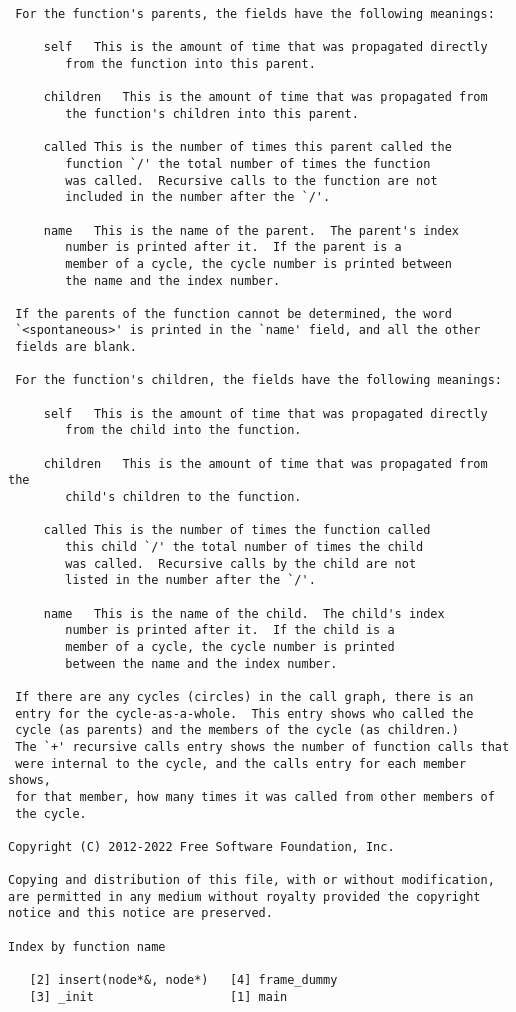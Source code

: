 \documentclass[pdf, unicode, 12pt, a4paper,oneside,fleqn]{article}
\begin{document}
\begin{lstlisting}
 For the function's parents, the fields have the following meanings:

     self	This is the amount of time that was propagated directly
		from the function into this parent.

     children	This is the amount of time that was propagated from
		the function's children into this parent.

     called	This is the number of times this parent called the
		function `/' the total number of times the function
		was called.  Recursive calls to the function are not
		included in the number after the `/'.

     name	This is the name of the parent.  The parent's index
		number is printed after it.  If the parent is a
		member of a cycle, the cycle number is printed between
		the name and the index number.

 If the parents of the function cannot be determined, the word
 `<spontaneous>' is printed in the `name' field, and all the other
 fields are blank.

 For the function's children, the fields have the following meanings:

     self	This is the amount of time that was propagated directly
		from the child into the function.

     children	This is the amount of time that was propagated from the
		child's children to the function.

     called	This is the number of times the function called
		this child `/' the total number of times the child
		was called.  Recursive calls by the child are not
		listed in the number after the `/'.

     name	This is the name of the child.  The child's index
		number is printed after it.  If the child is a
		member of a cycle, the cycle number is printed
		between the name and the index number.

 If there are any cycles (circles) in the call graph, there is an
 entry for the cycle-as-a-whole.  This entry shows who called the
 cycle (as parents) and the members of the cycle (as children.)
 The `+' recursive calls entry shows the number of function calls that
 were internal to the cycle, and the calls entry for each member shows,
 for that member, how many times it was called from other members of
 the cycle.

Copyright (C) 2012-2022 Free Software Foundation, Inc.

Copying and distribution of this file, with or without modification,
are permitted in any medium without royalty provided the copyright
notice and this notice are preserved.

Index by function name

   [2] insert(node*&, node*)   [4] frame_dummy
   [3] _init                   [1] main
\end{lstlisting}
\end{document}
